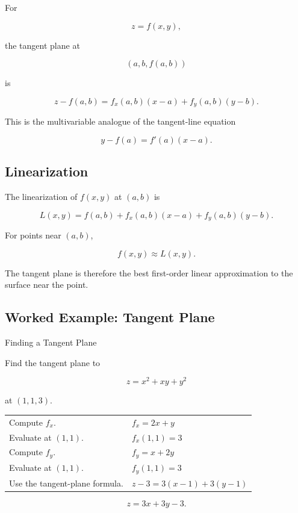 For

\[ z=f(x,y), \]

the tangent plane at

\[ (a,b,f(a,b)) \]

is

\[ \boxed{
z-f(a,b)
=
f_x(a,b)(x-a)
+
f_y(a,b)(y-b).
} \]

This is the multivariable analogue of the tangent-line equation

\[ y-f(a)=f'(a)(x-a). \]

\subsection{Linearization}
\label{subsec:multivariable-linearization}

The linearization of \(f(x,y)\) at \((a,b)\) is

\[ L(x,y)
=
f(a,b)
+
f_x(a,b)(x-a)
+
f_y(a,b)(y-b). \]

For points near \((a,b)\),

\[ f(x,y)\approx L(x,y). \]

The tangent plane is therefore the best first-order linear approximation to
the surface near the point.

\subsection{Worked Example: Tangent Plane}
\label{subsec:worked-tangent-plane}

\begin{workedexamplebox}{Finding a Tangent Plane}

Find the tangent plane to

\[ z=x^2+xy+y^2 \]

at \((1,1,3)\).

\begin{tabularx}{\textwidth}{@{}>{\raggedright\arraybackslash}p{}X@{}}
Compute \(f_x\). &
\(f_x=2x+y\)\\
Evaluate at \((1,1)\). &
\(f_x(1,1)=3\)\\
Compute \(f_y\). &
\(f_y=x+2y\)\\
Evaluate at \((1,1)\). &
\(f_y(1,1)=3\)\\
Use the tangent-plane formula. &
\(z-3=3(x-1)+3(y-1)\)
\end{tabularx}

\begin{answerbox}
\[ \boxed{z=3x+3y-3.} \]
\end{answerbox}
\end{workedexamplebox}


